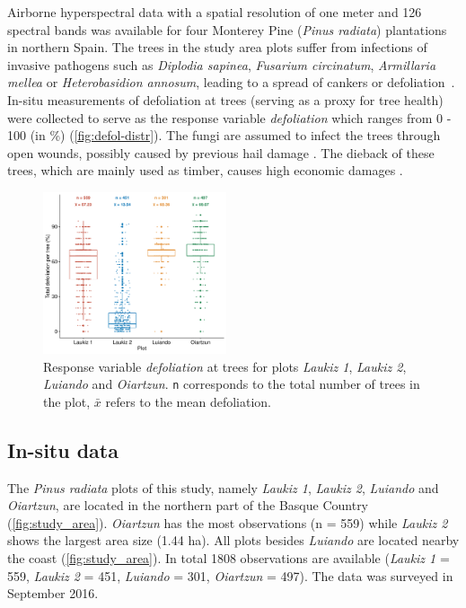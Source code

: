 \documentclass[letterpaper, peerreview, draftcls]{IEEEtran}
\begin{document}
\noindent Airborne hyperspectral data with a spatial resolution of one meter and 126 spectral bands was available for four Monterey Pine (\textit{Pinus radiata}) plantations in northern Spain.
The trees in the study area plots suffer from infections of invasive pathogens such as \textit{Diplodia sapinea}, \textit{Fusarium circinatum}, \textit{Armillaria mellea} or \textit{Heterobasidion annosum}, leading to a spread of cankers or defoliation~\cite{mesanza2016, iturritxa2017}.
In-situ measurements of defoliation at trees (serving as a proxy for tree health) were collected to serve as the response variable \textit{defoliation} which ranges from 0 - 100 (in \%) (\autoref{fig:defol-distr}).
The fungi are assumed to infect the trees through open wounds, possibly caused by previous hail damage \cite{iturritxa2014}.
The dieback of these trees, which are mainly used as timber, causes high economic damages \cite{ganley2009}.

\begin{figure} [t!]
	\centering
	\begin{center}
		\includegraphics[width=0.48\textwidth] {defoliation-distribution-plot-1.pdf}
		\caption{Response variable \textit{defoliation} at trees for plots \textit{Laukiz 1}, \textit{Laukiz 2}, \textit{Luiando} and \textit{Oiartzun}. \texttt{n} corresponds to the total number of trees in the plot, $\bar{x}$ refers to the mean defoliation.}\label{fig:defol-distr}
	\end{center}
\end{figure}

\subsection{In-situ data}

\noindent The \textit{Pinus radiata} plots of this study, namely \textit{Laukiz 1}, \textit{Laukiz 2}, \textit{Luiando} and \textit{Oiartzun}, are located in the northern part of the Basque Country (\autoref{fig:study_area}).
\textit{Oiartzun} has the most observations (n = 559) while \textit{Laukiz 2} shows the largest area size (1.44 ha).
All plots besides \textit{Luiando} are located nearby the coast (\autoref{fig:study_area}).
In total 1808 observations are available (\textit{Laukiz 1} = 559, \textit{Laukiz 2} = 451, \textit{Luiando} = 301, \textit{Oiartzun} = 497).
The data was surveyed in September 2016.
\end{document}
